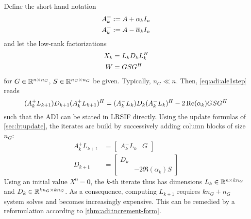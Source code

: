 Define the short-hand notation
\begin{equation}
\label{eq:adi:ale:shorthand}
\begin{aligned}
  A^+_k &:= A + \alpha_k I_n \\
  A^-_k &:= A - \conj\alpha_k I_n
\end{aligned}
\end{equation}
and let the low-rank factorizations
\begin{equation*}
\begin{aligned}
  X_k &= L_k D_k L_k^H \\
  W &= GSG^H
\end{aligned}
\end{equation*}
for $G\in\mathbb{R}^{n\times n_G}$, $S\in\mathbb{R}^{n_G\times n_G}$ be given.
Typically, $n_G \ll n$.
Then, \eqref{eq:adi:ale1step} reads
\begin{equation}
  (A_k^+ L_{k+1}) D_{k+1} (A_k^+ L_{k+1})^H
  = (A_k^- L_k) D_k (A_k^- L_k)^H - 2\operatorname{Re}(\alpha_k) GSG^H
\end{equation}
such that
the \ac{ADI} can be stated in \ac{LRSIF} directly.
Using the update formulas of \autoref{sec:lr:update},
the iterates are build by successively adding column blocks of size $n_G$:
\begin{align*}
  A_k^+ L_{k+1} &= \begin{bmatrix}
    A^-_k L_k &
    G
  \end{bmatrix} \\
  D_{k+1} &= \begin{bmatrix}
    D_k \\
    & -2\Re(\alpha_k) S
  \end{bmatrix}
\end{align*}
Using an initial value $X^0=0$,
the $k$-th iterate thus has dimensions $L_k \in\mathbb{R}^{n\times kn_G}$ and $D_k \in\mathbb{R}^{kn_G\times kn_G}$.
As a consequence, computing $L_{k+1}$
requires $kn_G + n_G$ system solves and
becomes increasingly expensive.
This can be remedied by a reformulation according to \autoref{thm:adi:increment-form}.

